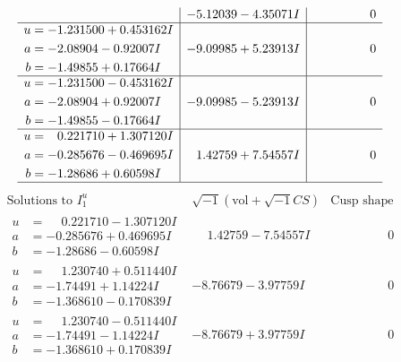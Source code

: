 \documentclass[1p]{elsarticle_modified}
\theoremstyle{definition}
\newcommand{\I}{\sqrt{-1}}
\begin{document}
$$\begin{array}{c|c|c}
 & -5.12039 - 4.35071 I & \phantom{-0.000000 } 0 \\ \hline\begin{aligned}
u &= -1.231500 + 0.453162 I \\
a &= -2.08904 - 0.92007 I \\
b &= -1.49855 + 0.17664 I\end{aligned}
 & -9.09985 + 5.23913 I & \phantom{-0.000000 } 0 \\ \hline\begin{aligned}
u &= -1.231500 - 0.453162 I \\
a &= -2.08904 + 0.92007 I \\
b &= -1.49855 - 0.17664 I\end{aligned}
 & -9.09985 - 5.23913 I & \phantom{-0.000000 } 0 \\ \hline\begin{aligned}
u &= \phantom{-}0.221710 + 1.307120 I \\
a &= -0.285676 - 0.469695 I \\
b &= -1.28686 + 0.60598 I\end{aligned}
 & \phantom{-}1.42759 + 7.54557 I & \phantom{-0.000000 } 0\\
 \hline 
 \end{array}$$\newpage$$\begin{array}{c|c|c}  
\text{Solutions to }I^u_{1}& \I (\text{vol} + \sqrt{-1}CS) & \text{Cusp shape}\\
 \hline 
\begin{aligned}
u &= \phantom{-}0.221710 - 1.307120 I \\
a &= -0.285676 + 0.469695 I \\
b &= -1.28686 - 0.60598 I\end{aligned}
 & \phantom{-}1.42759 - 7.54557 I & \phantom{-0.000000 } 0 \\ \hline\begin{aligned}
u &= \phantom{-}1.230740 + 0.511440 I \\
a &= -1.74491 + 1.14224 I \\
b &= -1.368610 - 0.170839 I\end{aligned}
 & -8.76679 - 3.97759 I & \phantom{-0.000000 } 0 \\ \hline\begin{aligned}
u &= \phantom{-}1.230740 - 0.511440 I \\
a &= -1.74491 - 1.14224 I \\
b &= -1.368610 + 0.170839 I\end{aligned}
 & -8.76679 + 3.97759 I & \phantom{-0.000000 } 0 \\ \hline\begin{aligned}

\end{aligned}
\end{array}$$
\end{document}
